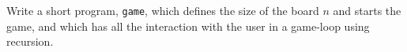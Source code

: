 Write a short program, \lstinline{game}, which defines the size of the board $n$ and starts the game, and which has all the interaction with the user in a game-loop using recursion.
